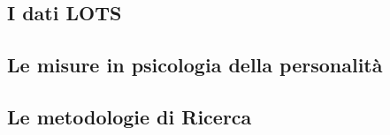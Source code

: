 \documentclass{subfiles}
\begin{document}
\subsection{I dati LOTS}


\subsection{Le misure in psicologia della personalità}


\subsection{Le metodologie di Ricerca}


\clearpage
\end{document}
